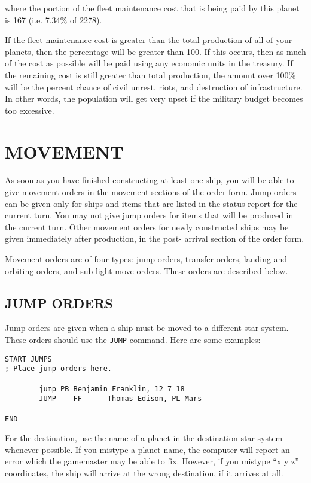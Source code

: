 \documentclass[10pt,titlepage]{article}
\begin{document}
where the portion of the fleet maintenance cost that is being paid by this
planet is 167 (i.e. 7.34\% of 2278).

If the fleet maintenance cost is greater than the total production of all of
your planets, then the percentage will be greater than 100.  If this occurs,
then as much of the cost as possible will be paid using any economic units in
the treasury.  If the remaining cost is still greater than total production,
the amount over 100\% will be the percent chance of civil unrest, riots, and
destruction of infrastructure.  In other words, the population will get very
upset if the military budget becomes too excessive.



\section{MOVEMENT}
\label{sec:movement}

As soon as you have finished constructing at least one ship, you will be able
to give movement orders in the movement sections of the order form.  Jump
orders can be given only for ships and items that are listed in the status
report for the current turn.  You may not give jump orders for items that
will be produced in the current turn.  Other movement orders for newly
constructed ships may be given immediately after production, in the post-
arrival section of the order form.

Movement orders are of four types: jump orders, transfer orders, landing and
orbiting orders, and sub-light move orders.  These orders are described below.


\subsection{JUMP ORDERS}
\label{sec:jumporders}


Jump orders are given when a ship must be moved to a different star system.
These orders should use the \texttt{JUMP} command.  Here are some examples:

\begin{verbatim}
START JUMPS
; Place jump orders here.

        jump PB Benjamin Franklin, 12 7 18
        JUMP    FF      Thomas Edison, PL Mars

END
\end{verbatim} 

For the destination, use the name of a planet in the destination star system
whenever possible.  If you mistype a planet name, the computer will report an
error which the gamemaster may be able to fix.  However, if you mistype ``x y z''
coordinates, the ship will arrive at the wrong destination, if it arrives at
all.
\end{document}
